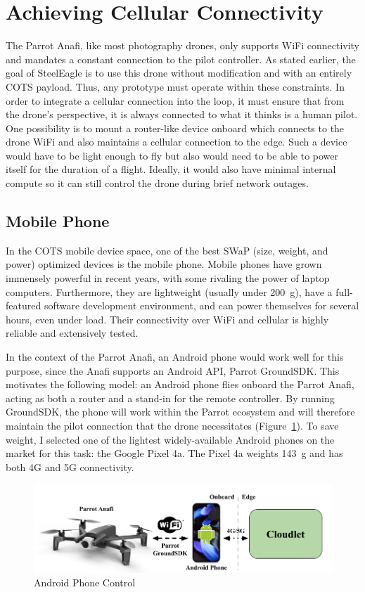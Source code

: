 \section{Achieving Cellular Connectivity}
\label{sec:achieving-cell-conn}
The Parrot Anafi, like most photography drones, only supports WiFi connectivity and mandates a constant connection to the pilot controller. As stated earlier, the goal of SteelEagle is to use this drone without modification and with an entirely COTS payload.  Thus, any prototype must operate within these constraints. In order to integrate a cellular connection into the loop, it must ensure that from the drone's perspective, it is always connected to what it thinks is a human pilot. One possibility is to mount a router-like device onboard which connects to the drone WiFi and also maintains a cellular connection to the edge. Such a device would have to be light enough to fly but also would need to be able to power itself for the duration of a flight. Ideally, it would also have minimal internal compute so it can still control the drone during brief network outages.

\subsection{Mobile Phone}
In the COTS mobile device space, one of the best SWaP (size, weight, and power) optimized devices is the mobile phone. Mobile phones have grown immensely powerful in recent years, with some rivaling the power of laptop computers. Furthermore, they are lightweight (usually under 200~g), have a full-featured software development environment, and can power themselves for several hours, even under load. Their connectivity over WiFi and cellular is highly reliable and extensively tested.

In the context of the Parrot Anafi, an Android phone would work well for this purpose, since the Anafi supports an Android API, Parrot GroundSDK. This motivates the following model: an Android phone flies onboard the Parrot Anafi, acting as both a router and a stand-in for the remote controller. By running GroundSDK, the phone will work within the Parrot ecosystem and will therefore maintain the pilot connection that the drone necessitates (Figure~\ref{fig:phone-control}). To save weight, I selected one of the lightest widely-available Android phones on the market for this task: the Google Pixel 4a. The Pixel 4a weights 143~g and has both 4G and 5G connectivity.

\begin{figure}
    \centering
    \includegraphics[width=1.0\linewidth]{chapter3/FIGS/onboard-phone.png}
    \caption{Android Phone Control~\cite{ParrotAnafi}}
    \label{fig:phone-control}
\end{figure}

